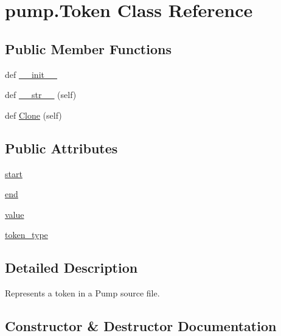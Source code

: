 \hypertarget{classpump_1_1_token}{}\section{pump.\+Token Class Reference}
\label{classpump_1_1_token}
\subsection*{Public Member Functions}
\begin{DoxyCompactItemize}
\item 
def \hyperlink{classpump_1_1_token_a3b3ced23ee340e022ef7213dc271930c}{\+\_\+\+\_\+init\+\_\+\+\_\+}
\item 
def \hyperlink{classpump_1_1_token_ad0079ae4449d89bc2d5756488099cb33}{\+\_\+\+\_\+str\+\_\+\+\_\+} (self)
\item 
def \hyperlink{classpump_1_1_token_abc0f2d2a0bcad953f5fc85a4e52076eb}{Clone} (self)
\end{DoxyCompactItemize}
\subsection*{Public Attributes}
\begin{DoxyCompactItemize}
\item 
\hyperlink{classpump_1_1_token_a53e3333a770bc8773224a5af78bca5bb}{start}
\item 
\hyperlink{classpump_1_1_token_abb88c0ece4274cfd974fd01d0468953c}{end}
\item 
\hyperlink{classpump_1_1_token_a5b7ab395a380b775b2bf0a8b0abfda86}{value}
\item 
\hyperlink{classpump_1_1_token_aeac105b76f6af13c8c64ba0a94e37d90}{token\+\_\+type}
\end{DoxyCompactItemize}


\subsection{Detailed Description}
\begin{DoxyVerb}Represents a token in a Pump source file.\end{DoxyVerb}
 

\subsection{Constructor \& Destructor Documentation}
\hypertarget{classpump_1_1_token_a3b3ced23ee340e022ef7213dc271930c}{}
